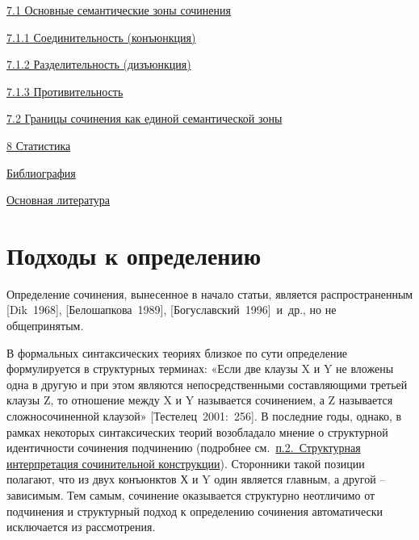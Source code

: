 \protect\hyperlink{ux43eux441ux43dux43eux432ux43dux44bux435-ux441ux435ux43cux430ux43dux442ux438ux447ux435ux441ux43aux438ux435-ux437ux43eux43dux44b-ux441ux43eux447ux438ux43dux435ux43dux438ux44f}{7.1
Основные семантические зоны сочинения}

\protect\hyperlink{ux441ux43eux435ux434ux438ux43dux438ux442ux435ux43bux44cux43dux43eux441ux442ux44c-ux43aux43eux43dux44aux44eux43dux43aux446ux438ux44f}{7.1.1
Соединительность (конъюнкция)}

\protect\hyperlink{ux440ux430ux437ux434ux435ux43bux438ux442ux435ux43bux44cux43dux43eux441ux442ux44c-ux434ux438ux437ux44aux44eux43dux43aux446ux438ux44f}{7.1.2
Разделительность (дизъюнкция)}

\protect\hyperlink{ux43fux440ux43eux442ux438ux432ux438ux442ux435ux43bux44cux43dux43eux441ux442ux44c}{7.1.3
Противительность}

\protect\hyperlink{ux433ux440ux430ux43dux438ux446ux44b-ux441ux43eux447ux438ux43dux435ux43dux438ux44f-ux43aux430ux43a-ux435ux434ux438ux43dux43eux439-ux441ux435ux43cux430ux43dux442ux438ux447ux435ux441ux43aux43eux439-ux437ux43eux43dux44b}{7.2
Границы сочинения как единой семантической зоны}

\protect\hyperlink{ux441ux442ux430ux442ux438ux441ux442ux438ux43aux430}{8
Статистика}

\protect\hyperlink{ux431ux438ux431ux43bux438ux43eux433ux440ux430ux444ux438ux44f}{Библиография}

\protect\hyperlink{ux43eux441ux43dux43eux432ux43dux430ux44f-ux43bux438ux442ux435ux440ux430ux442ux443ux440ux430}{Основная
литература}

\hypertarget{ux43fux43eux434ux445ux43eux434ux44b-ux43a-ux43eux43fux440ux435ux434ux435ux43bux435ux43dux438ux44e}{%
\section{Подходы к
определению}\label{ux43fux43eux434ux445ux43eux434ux44b-ux43a-ux43eux43fux440ux435ux434ux435ux43bux435ux43dux438ux44e}}

Определение сочинения, вынесенное в начало статьи, является
распространенным {[}Dik~1968{]}, {[}Белошапкова~1989{]},
{[}Богуславский~1996{]}~и~др., но не общепринятым.

В формальных синтаксических теориях близкое по сути определение
формулируется в структурных терминах: «Если две клаузы X и Y не вложены
одна в другую и при этом являются непосредственными составляющими
третьей клаузы Z, то отношение между X и Y называется сочинением, а Z
называется сложносочиненной клаузой» {[}Тестелец~2001:~256{]}. В
последние годы, однако, в рамках некоторых синтаксических теорий
возобладало мнение о структурной идентичности сочинения подчинению
(подробнее см.~\underline{п.2.~Структурная интерпретация сочинительной
конструкции}). Сторонники такой позиции полагают, что из двух конъюнктов
Х и Y один является главным, а другой -- зависимым. Тем самым, сочинение
оказывается структурно неотличимо от подчинения и структурный подход к
определению сочинения автоматически исключается из рассмотрения.

